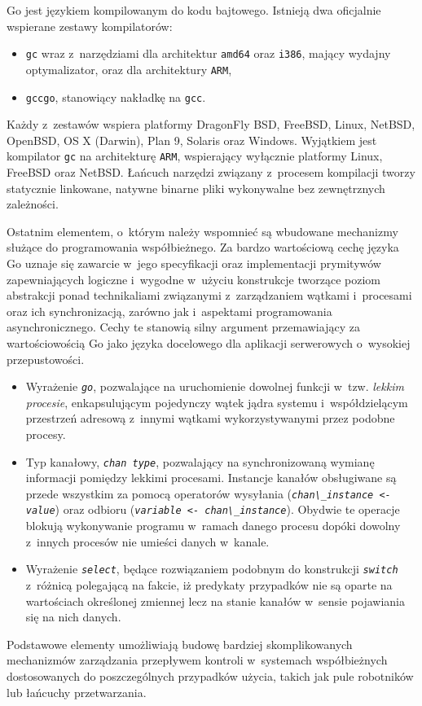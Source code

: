 \par{
  Go jest językiem kompilowanym do kodu bajtowego. Istnieją dwa oficjalnie wspierane zestawy kompilatorów:
  \begin{itemize}
    \item \texttt{gc} wraz z~narzędziami dla architektur \texttt{amd64} oraz \texttt{i386}, mający wydajny optymalizator, oraz dla architektury \texttt{ARM},
    \item \texttt{gccgo}, stanowiący nakładkę na \texttt{gcc}.
  \end{itemize}
  Każdy z~zestawów wspiera platformy DragonFly BSD, FreeBSD, Linux, NetBSD, OpenBSD, OS X (Darwin), Plan 9, Solaris oraz Windows. Wyjątkiem jest kompilator \texttt{gc} na architekturę \texttt{ARM}, wspierający wyłącznie platformy Linux, FreeBSD oraz NetBSD. \cite{godoc:compilers}
  Łańcuch narzędzi związany z~procesem kompilacji tworzy statycznie linkowane, natywne binarne pliki wykonywalne bez zewnętrznych zależności.
}

\par{
  Ostatnim elementem, o~którym należy wspomnieć są wbudowane mechanizmy służące do programowania współbieżnego.
  Za bardzo wartościową cechę języka Go uznaje się zawarcie w~jego specyfikacji oraz implementacji prymitywów zapewniających logiczne i~wygodne w~użyciu konstrukcje tworzące poziom abstrakcji ponad technikaliami związanymi z~zarządzaniem wątkami i~procesami oraz ich synchronizacją, zarówno jak i~aspektami programowania asynchronicznego.
  Cechy te stanowią silny argument przemawiający za wartościowością Go jako języka docelowego dla aplikacji serwerowych o~wysokiej przepustowości.
  \begin{itemize}
    \item Wyrażenie \textit{\lstinline{go}}, pozwalające na uruchomienie dowolnej funkcji w~tzw. \emph{lekkim procesie}, enkapsulującym pojedynczy wątek jądra systemu i~współdzielącym przestrzeń adresową z~innymi wątkami wykorzystywanymi przez podobne procesy.
    \item Typ kanałowy, \textit{\lstinline{chan type}}, pozwalający na synchronizowaną wymianę informacji pomiędzy lekkimi procesami. Instancje kanałów obsługiwane są przede wszystkim za pomocą operatorów wysyłania (\textit{\lstinline{chan\_instance <- value}}) oraz odbioru (\textit{\lstinline{variable <- chan\_instance}}). Obydwie te operacje blokują wykonywanie programu w~ramach danego procesu dopóki dowolny z~innych procesów nie umieści danych w~kanale.
    \item Wyrażenie \textit{\lstinline{select}}, będące rozwiązaniem podobnym do konstrukcji \textit{\lstinline{switch}} z~różnicą polegającą na fakcie, iż predykaty przypadków nie są oparte na wartościach określonej zmiennej lecz na stanie kanałów w~sensie pojawiania się na nich danych.
  \end{itemize}
  Podstawowe elementy umożliwiają budowę bardziej skomplikowanych mechanizmów zarządzania przepływem kontroli w~systemach współbieżnych dostosowanych do poszczególnych przypadków użycia, takich jak pule robotników lub łańcuchy przetwarzania.
}
